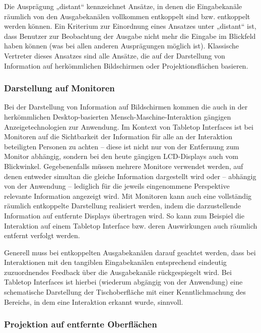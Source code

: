 Die Ausprägung „distant“ kennzeichnet Ansätze, in denen die Eingabekanäle räumlich von den Ausgabekanälen vollkommen entkoppelt sind bzw. entkoppelt werden können. Ein Kriterium zur Einordnung eines Ansatzes unter „distant“ ist, dass Benutzer zur Beobachtung der Ausgabe nicht mehr die Eingabe im Blickfeld haben können (was bei allen anderen Ausprägungen möglich ist). Klassische Vertreter dieses Ansatzes sind alle Ansätze, die auf der Darstellung von Information auf herkömmlichen Bildschirmen oder Projektionsflächen basieren.

\subsubsection{Darstellung auf Monitoren} %
\label{ssub:monitore}

Bei der Darstellung von Information auf Bildschirmen kommen die auch in der herkömmlichen Desktop-basierten Mensch-Maschine-Interaktion gängigen Anzeigetechnologien zur Anwendung. Im Kontext von Tabletop Interfaces ist bei Monitoren auf die Sichtbarkeit der Information für alle an der Interaktion beteiligten Personen zu achten -- diese ist nicht nur von der Entfernung zum Monitor abhängig, sondern bei den heute gängigen \gls{LCD}-Displays auch vom Blickwinkel. Gegebenenfalls müssen mehrere Monitore verwendet werden, auf denen entweder simultan die gleiche  Information dargestellt wird oder -- abhängig von der Anwendung -- lediglich für die jeweils eingenommene Perspektive relevante Information angezeigt wird. Mit Monitoren kann auch eine vollständig räumlich entkoppelte Darstellung realisiert werden, indem die darzustellende Information auf entfernte Displays übertragen wird. So kann zum Beispiel die Interaktion auf einem Tabletop Interface bzw. deren Auswirkungen auch räumlich entfernt verfolgt werden.

Generell muss bei entkoppelten Ausgabekanälen darauf geachtet werden, dass bei Interaktionen mit den tangiblen Eingabekanälen entsprechend eindeutig zuzuordnendes Feedback über die Ausgabekanäle rückgespiegelt wird. Bei Tabletop Interfaces ist hierbei (wiederum abgängig von der Anwendung) eine schematische Darstellung der Tischoberfläche mit einer Kenntlichmachung des Bereichs, in dem eine Interaktion erkannt wurde, sinnvoll.


\subsubsection{Projektion auf entfernte Oberflächen} %
\label{ssub:projektion}

